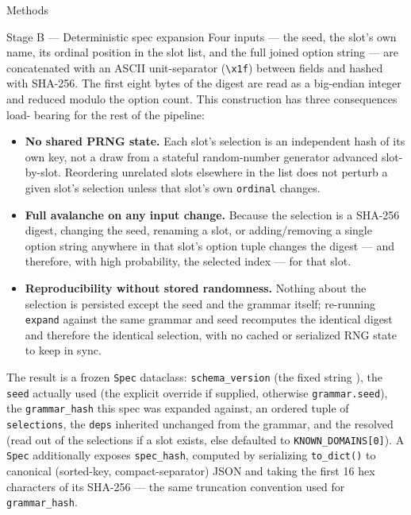 \documentclass[
  ignorenonframetext,
]{beamer}
\providecommand{\tightlist}{%
  \setlength{\itemsep}{0pt}\setlength{\parskip}{0pt}}
\begin{document}
\begin{frame}{Methods}
\begin{block}{Stage B --- Deterministic spec expansion}
Four inputs --- the seed, the slot's own name, its ordinal position in
the slot list, and the full joined option string --- are concatenated
with an ASCII unit-separator (\texttt{\textbackslash{}x1f}) between
fields and hashed with SHA-256. The first eight bytes of the digest are
read as a big-endian integer and reduced modulo the option count. This
construction has three consequences load- bearing for the rest of the
pipeline:

\begin{itemize}
\tightlist
\item
  \textbf{No shared PRNG state.} Each slot's selection is an independent
  hash of its own key, not a draw from a stateful random-number
  generator advanced slot-by-slot. Reordering unrelated slots elsewhere
  in the list does not perturb a given slot's selection unless that
  slot's own \texttt{ordinal} changes.
\item
  \textbf{Full avalanche on any input change.} Because the selection is
  a SHA-256 digest, changing the seed, renaming a slot, or
  adding/removing a single option string anywhere in that slot's option
  tuple changes the digest --- and therefore, with high probability, the
  selected index --- for that slot.
\item
  \textbf{Reproducibility without stored randomness.} Nothing about the
  selection is persisted except the seed and the grammar itself;
  re-running \texttt{expand} against the same grammar and seed
  recomputes the identical digest and therefore the identical selection,
  with no cached or serialized RNG state to keep in sync.
\end{itemize}

The result is a frozen \texttt{Spec} dataclass: \texttt{schema\_version}
(the fixed string ), the \texttt{seed}
actually used (the explicit override if supplied, otherwise
\texttt{grammar.seed}), the \texttt{grammar\_hash} this spec was
expanded against, an ordered tuple of
 \texttt{selections}, the
\texttt{deps} inherited unchanged from the grammar, and the resolved
 (read out of the selections if a
 slot exists, else defaulted to
\texttt{KNOWN\_DOMAINS{[}0{]}}). A \texttt{Spec} additionally exposes
\texttt{spec\_hash}, computed by serializing \texttt{to\_dict()} to
canonical (sorted-key, compact-separator) JSON and taking the first 16
hex characters of its SHA-256 --- the same truncation convention used
for \texttt{grammar\_hash}.


\end{block}
\end{frame}
\end{document}
